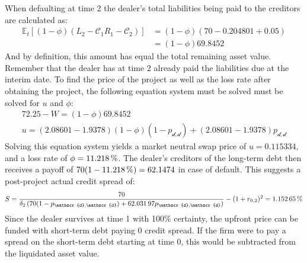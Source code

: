 \documentclass[main.tex]{subfiles}
\begin{document}
            When defaulting at time 2
            the dealer's total liabilities being paid to the creditors are calculated as:
            \begin{align*}
                \mathbb{E}_{t}\left[
                    (1-\phi)\left(L_{2} - 
                    \mathcal{C}_{1}R_{1}
                    - \mathcal{C}_2\right)
                \right]
                &=
                (1-\phi)\left(\num{70} - \num{0.204801} + \num{0.05}\right)\\
                &=
                (1-\phi)\num{69.8452}
            \end{align*}
            And by definition, this amount has equal the total remaining asset value.
            Remember that the dealer has at time 2 already paid the liabilities due at the interim date.
            To find the price of the project
            as well as the loss rate after obtaining the project,
            the following equation system must be solved must be solved for $u$ and $\phi$:
            \begin{align}
                \num{72.25} - W
                =
                (1-\phi)\num{69.8452}
                \\
                u =
                (\num{2.08601} - \num{1.9378})(1-\phi)\left(1-p_{\mathscr{d},\mathscr{d}}\right)
                +
                (\num{2.08601} - \num{1.9378})p_{\mathscr{d},\mathscr{d}}
            \end{align}
            Solving this equation system yields a market neutral swap price of $u=\num{0.115334}$,
            and a loss rate of $\phi=\pct{0.11218}$.
            The dealer's creditors of the long-term debt then receives a payoff of $70(1-\pct{0.11218})=\num{62.1474}$ in case of default.
            This suggests a post-project actual credit spread of:
            \begin{equation}
                S = \frac{
                    \num{70}
                }{  
                    \delta_{2}\left(
                        \num{70}(1-p_{\mathscr{d},\mathscr{d}})
                        +
                        \num{62.03197}p_{\mathscr{d},\mathscr{d}}
                    \right)
                } - (1+r_{0,2})^{2}
                =
                \pct{0.0115265}
            \end{equation}
            Since the dealer survives at time 1 with 100\% certainty,
            the upfront price can be funded with short-term debt paying 0 credit spread.
            If the firm were to pay a spread on the short-term debt starting at time 0,
            this would be subtracted from the liquidated asset value. 
\end{document}
